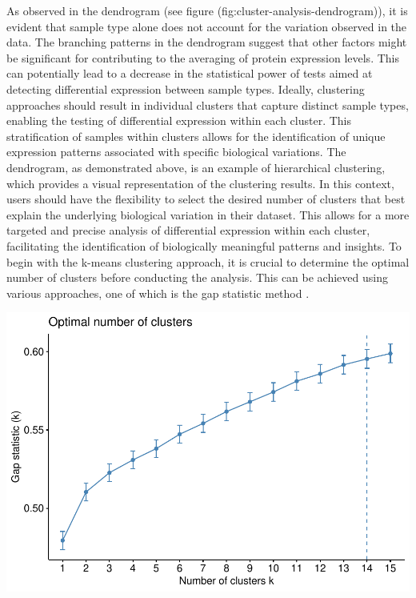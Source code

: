 \documentclass[
  11pt,
]{article}
\let\origfigure\figure
\begin{document}
As observed in the dendrogram (see figure (fig:cluster-analysis-dendrogram)), it is evident that sample type alone does not account for the variation observed in the data. The branching patterns in the dendrogram suggest that other factors might be significant for contributing to the averaging of protein expression levels. This can potentially lead to a decrease in the statistical power of tests aimed at detecting differential expression between sample types.
Ideally, clustering approaches should result in individual clusters that capture distinct sample types, enabling the testing of differential expression within each cluster. This stratification of samples within clusters allows for the identification of unique expression patterns associated with specific biological variations. The dendrogram, as demonstrated above, is an example of hierarchical clustering, which provides a visual representation of the clustering results. In this context, users should have the flexibility to select the desired number of clusters that best explain the underlying biological variation in their dataset. This allows for a more targeted and precise analysis of differential expression within each cluster, facilitating the identification of biologically meaningful patterns and insights.
To begin with the k-means clustering approach, it is crucial to determine the optimal number of clusters before conducting the analysis. This can be achieved using various approaches, one of which is the gap statistic method \citep{Tibshirani2001}.

\bgroup  \origfigure[H] 

{\centering \includegraphics[width=0.9\linewidth]{Thesis_files/figure-latex/cluster-analysis-gap-stat-1} 

}
\end{document}
